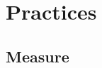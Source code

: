 
\section{Practices}
\setcounter{subsection}{1}
\subsection{Measure}


%
%	
%
%	
%
%		
%		
%
%
%	
%	
%	
%
%
%
%
%
%
%	
%	

